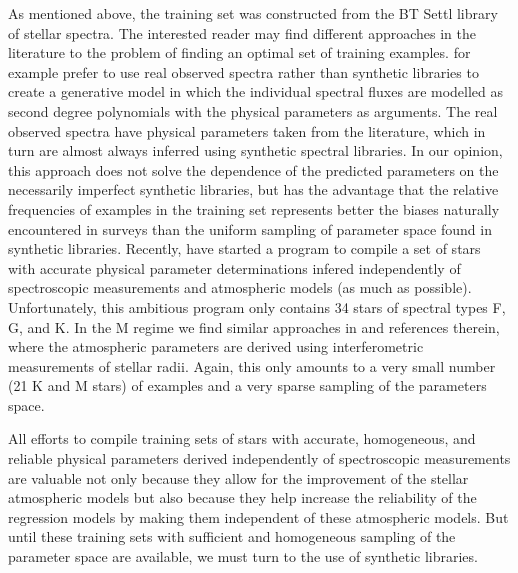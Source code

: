 {As mentioned above, the training set was constructed from the BT Settl
library of stellar spectra. The interested reader may find different
approaches in the literature to the problem of finding an optimal set
of training examples. \cite{hoggCannon} for example prefer to use real
observed spectra rather than synthetic libraries to create a
generative model in which the individual spectral fluxes are modelled
as second degree polynomials with the physical parameters as
arguments. The real observed spectra have physical parameters taken
from the literature, which in turn are almost always inferred using
synthetic spectral libraries. In our opinion, this approach does not
solve the dependence of the predicted parameters on the necessarily
imperfect synthetic libraries, but has the advantage that the relative
frequencies of examples in the training set represents better the
biases naturally encountered in surveys than the uniform sampling of
parameter space found in synthetic libraries. Recently, \cite{heiter}
have started a program to compile a set of stars with accurate
physical parameter determinations infered independently of
spectroscopic measurements and atmospheric models (as much as
possible). Unfortunately, this ambitious program only contains 34
stars of spectral types F, G, and K. In the M regime we find similar
approaches in \cite{2014AJ....147...47B} and references therein, where
the atmospheric parameters are derived using interferometric
measurements of stellar radii. Again, this only amounts to a very
small number (21 K and M stars) of examples and a very sparse sampling
of the parameters space.

All efforts to compile training sets of stars with accurate,
homogeneous, and reliable physical parameters derived independently of
spectroscopic measurements are valuable not only because they allow
for the improvement of the stellar atmospheric models but also because
they help increase the reliability of the regression models by making
them independent of these atmospheric models. But until these training
sets with sufficient and homogeneous sampling of the parameter space
are available, we must turn to the use of synthetic libraries.


}
